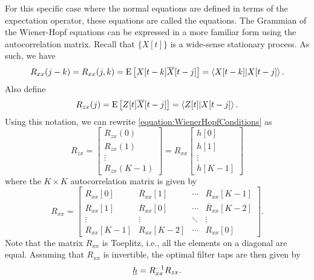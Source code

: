For this specific case where the normal equations are defined in terms of the expectation operator, these equations are called the  equations.
The Grammian of the Wiener-Hopf equations can be expressed in a more familiar form using the autocorrelation matrix.
Recall that $\{ X[t] \}$ is a wide-sense stationary process.
As such, we have
\begin{equation*}
R_{xx} (j-k) = R_{xx} (j, k) = \mathrm{E} \left[ X[t-k] \overline{X}[t-j] \right]
= \left\langle X[t-k] | X[t-j] \right\rangle .
\end{equation*}
Also define
\begin{equation*}
R_{zx}(j) = \mathrm{E} \left[ Z[t] \overline{X}[t-j] \right]
= \left\langle Z[t] | X[t-j] \right\rangle .
\end{equation*}
Using this notation, we can rewrite \eqref{equation:WienerHopfConditions} as
\begin{equation*}
R_{zx} = \left[ \begin{array}{c}
R_{zx} (0) \\ R_{zx} (1) \\ \vdots \\ R_{zx} (K-1) \end{array} \right]
= R_{xx}
\left[ \begin{array}{c}
h [0] \\
h [1] \\ \vdots \\
h [K-1] \end{array} \right]
\end{equation*}
where the $K \times K$ autocorrelation matrix is given by
\begin{equation*}
R_{xx} = \left[ \begin{array}{cccc}
R_{xx} [0] & \overline{R}_{xx}[1] & \cdots & \overline{R}_{xx}[K-1] \\
R_{xx} [1] & R_{xx}[0] & \cdots & \overline{R}_{xx}[K-2] \\
\vdots & \vdots & \ddots & \vdots \\
R_{xx} [K-1] & R_{xx}[K-2] & \cdots & R_{xx}[0]
\end{array} \right] .
\end{equation*}
Note that the matrix $R_{xx}$ is Toeplitz, i.e., all the elements on a diagonal are equal.
Assuming that $R_{xx}$ is invertible, the optimal filter taps are then given by
\begin{equation*}
\underline{h} = R_{xx}^{-1} R_{zx}.
\end{equation*}

